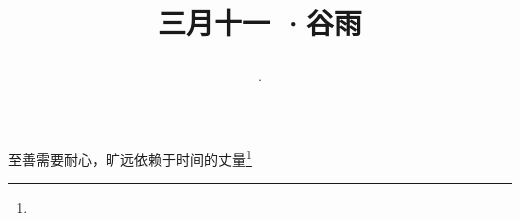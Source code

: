\title{\date[d=19,m=4,y=2024][year:cn-y,年,month:cn,day:cn,日,·,weekday]·三月十一 ·谷雨}
至善需要耐心，旷远依赖于时间的丈量\footnote{ }

